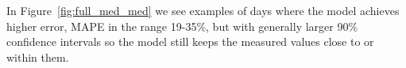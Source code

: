 In Figure~\ref{fig:full_med_med} we see examples of days where the model achieves higher error, MAPE in the range 19-35\%, but with generally larger 90\% confidence intervals so the model still keeps the measured values close to or within them.

